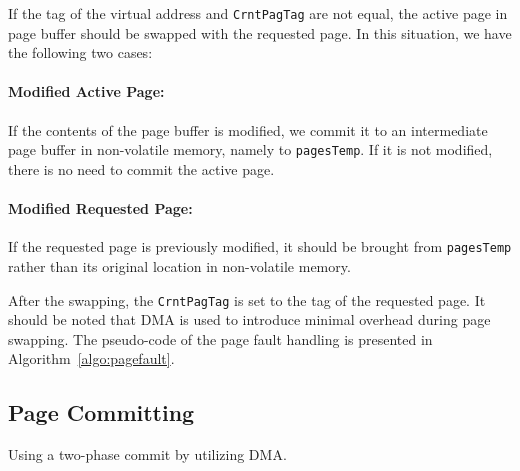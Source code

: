 If the tag of the virtual address and \texttt{CrntPagTag} are not equal, the active page in page buffer should be swapped with the requested page. In this situation, we have the following two cases:
\paragraph{Modified Active Page:} If the contents of the page buffer is modified, we commit it to an intermediate page buffer in non-volatile memory, namely to \texttt{pagesTemp}. If it is not modified, there is no need to commit the active page.

\paragraph{Modified Requested Page:}  If the requested page is previously modified, it should be brought from \texttt{pagesTemp} rather than its original location in non-volatile memory. 

After the swapping, the \texttt{CrntPagTag} is set to the tag of the requested page. It should be noted that DMA is used to introduce minimal overhead during page swapping. The pseudo-code of the page fault handling is presented in Algorithm~\ref{algo:pagefault}.



\subsection{Page Committing}

Using a two-phase commit by utilizing DMA. 